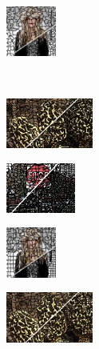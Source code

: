 \begin{figure}
	\begin{subfigure}[b]{0.10\textwidth}
		\includegraphics[height=1.65cm]{pictures/fash/cw/cropped/cw_132_contours}
	\end{subfigure}\\
	\begin{subfigure}[b]{0.02\textwidth}
	\end{subfigure}
	\begin{subfigure}[b]{0.16\textwidth}
		\includegraphics[height=1.65cm]{pictures/bsds500/ergc/cropped/ergc_208078_contours}
	\end{subfigure}
	\begin{subfigure}[b]{0.129\textwidth}
		\includegraphics[height=1.65cm]{pictures/sbd/ergc/cropped/ergc_6000067_contours}
	\end{subfigure}
	\begin{subfigure}[b]{0.10\textwidth}
		\includegraphics[height=1.65cm]{pictures/fash/ergc/cropped/ergc_132_contours}
	\end{subfigure}
	\begin{subfigure}[b]{0.02\textwidth}
	\end{subfigure}
	\begin{subfigure}[b]{0.16\textwidth}
		\includegraphics[height=1.65cm]{pictures/bsds500/mss/cropped/mss_208078_contours}

\end{subfigure}
\end{figure}
